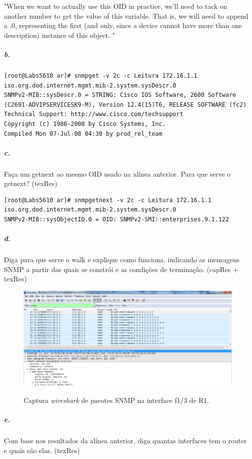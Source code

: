"When we want to actually use this OID in practice, we’ll need to tack on another number to get the value of this variable. That is, we will need to append a .0, representing the first (and only, since a device cannot have more than one description) instance of this object.
"


\subparagraph{b.}
\begin{verbatim}
[root@Labs5610 ar]# snmpget -v 2c -c Leitura 172.16.1.1 iso.org.dod.internet.mgmt.mib-2.system.sysDescr.0
SNMPv2-MIB::sysDescr.0 = STRING: Cisco IOS Software, 2600 Software (C2691-ADVIPSERVICESK9-M), Version 12.4(15)T6, RELEASE SOFTWARE (fc2)
Technical Support: http://www.cisco.com/techsupport
Copyright (c) 1986-2008 by Cisco Systems, Inc.
Compiled Mon 07-Jul-08 04:30 by prod_rel_team
\end{verbatim}


\subparagraph{c.}
Faça um getnext ao mesmo OID usado na alínea anterior. Para que serve o getnext? (texRes)

\begin{verbatim}
[root@Labs5610 ar]# snmpgetnext -v 2c -c Leitura 172.16.1.1 iso.org.dod.internet.mgmt.mib-2.system.sysDescr.0
SNMPv2-MIB::sysObjectID.0 = OID: SNMPv2-SMI::enterprises.9.1.122
\end{verbatim}


\subparagraph{d.}
Diga para que serve o walk e explique como funciona, indicando as mensagens SNMP a partir das quais se constrói e as condições de terminação. (capRes + texRes)

\begin{figure}[h]
\centering
\includegraphics[width=1\textwidth, height=0.33\textheight]{5d.png}
\label{fig:2-capturaWireshark}
\caption{Captura \emph{wireshark} de pacotes SNMP na interface \textsf{f1/3} de \textsf{R1}.}
\end{figure}


\subparagraph{e.}
Com base nos resultados da alínea anterior, diga quantas interfaces tem o router e quais são elas. (texRes)


